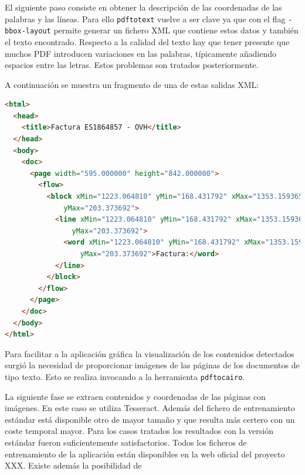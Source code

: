El siguiente paso consiste en obtener la descripción de las coordenadas de las palabras y las líneas. Para ello \verb|pdftotext| vuelve a ser clave ya que con el flag \verb|-bbox-layout| permite generar un fichero XML que contiene estos datos y también el texto encontrado. Respecto a la calidad del texto hay que tener presente que muchos PDF introducen variaciones en las palabras, típicamente añadiendo espacios entre las letras. Estos problemas son tratados posteriormente.

A continuación se muestra un fragmento de una de estas salidas XML:

\begin{lstlisting}[language=HTML,caption={Obtención del identificador del trabajo},label=lst:salida-pdftotext]
<html>
  <head>
    <title>Factura ES1864857 - OVH</title>
  </head>
  <body>
    <doc>
      <page width="595.000000" height="842.000000">
        <flow>
          <block xMin="1223.064810" yMin="168.431792" xMax="1353.159365" 
              yMax="203.373692">
            <line xMin="1223.064810" yMin="168.431792" xMax="1353.159365" 
                yMax="203.373692">
              <word xMin="1223.064810" yMin="168.431792" xMax="1353.159365" 
                  yMax="203.373692">Factura:</word>
            </line>
          </block>
        </flow>
      </page>
    </doc>
  </body>
</html>
\end{lstlisting}


Para facilitar a la aplicación gráfica la visualización de los contenidos detectados surgió la necesidad de proporcionar imágenes de las páginas de los documentos de tipo texto. Esto se realiza invocando a la herramienta \verb|pdftocairo|. 

La siguiente fase se extraen contenidos y coordenadas de las páginas con imágenes. En este caso se utiliza Tesseract. Además del fichero de entrenamiento estándar está disponible otro de mayor tamaño y que resulta más certero con un coste temporal mayor. Para los casos tratados los resultados con la versión estándar fueron suficientemente satisfactorios. Todos los ficheros de entrenamiento de la aplicación están disponibles en la web oficial del proyecto XXX. Existe además la posibilidad de %

